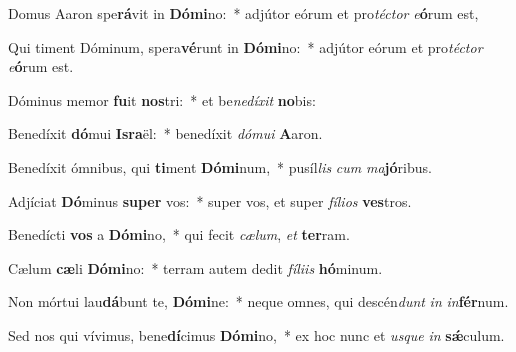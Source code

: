 \item Domus Aaron spe\textbf{rá}vit in \textbf{Dó}\textbf{mi}no:~* adjútor eórum et pro\textit{téc}\textit{tor} \textit{e}\textbf{ó}rum est,
\item Qui timent Dóminum, spera\textbf{vé}runt in \textbf{Dó}\textbf{mi}no:~* adjútor eórum et pro\textit{téc}\textit{tor} \textit{e}\textbf{ó}rum est.
\item Dóminus memor \textbf{fu}it \textbf{nos}tri:~* et be\textit{ne}\textit{dí}\textit{xit} \textbf{no}bis:
\item Benedíxit \textbf{dó}mui \textbf{Is}\textbf{ra}ël:~* benedíxit \textit{dó}\textit{mu}\textit{i} \textbf{A}aron.
\item Benedíxit ómnibus, qui \textbf{ti}ment \textbf{Dó}\textbf{mi}num,~* pusíl\textit{lis} \textit{cum} \textit{ma}\textbf{jó}ribus.
\item Adjíciat \textbf{Dó}minus \textbf{su}\textbf{per} vos:~* super vos, et super \textit{fí}\textit{li}\textit{os} \textbf{ves}tros.
\item Benedícti \textbf{vos} a \textbf{Dó}\textbf{mi}no,~* qui fecit \textit{cæ}\textit{lum}, \textit{et} \textbf{ter}ram.
\item Cælum \textbf{cæ}li \textbf{Dó}\textbf{mi}no:~* terram autem dedit \textit{fí}\textit{li}\textit{is} \textbf{hó}minum.
\item Non mórtui lau\textbf{dá}bunt te, \textbf{Dó}\textbf{mi}ne:~* neque omnes, qui descén\textit{dunt} \textit{in} \textit{in}\textbf{fér}num.
\item Sed nos qui vívimus, bene\textbf{dí}cimus \textbf{Dó}\textbf{mi}no,~* ex hoc nunc et \textit{us}\textit{que} \textit{in} \textbf{sǽ}culum.
